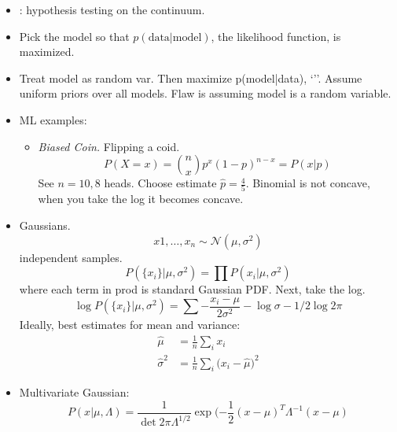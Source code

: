 \documentclass[12pt]{article}
\begin{document}
\begin{itemize}
	\item {}: hypothesis testing on the continuum. 
	\item {} Pick the model so that $p(\text{data}|\text{model})$, the likelihood function, is maximized. 
	\item Treat model as random var. Then maximize p(model|data), `''. Assume uniform priors over all models. Flaw is assuming model is a random variable. 
	\item ML examples:
	\begin{itemize}
		\item \textit{Biased Coin.} Flipping a coid. 
		\begin{equation}
		P(X = x) = {n \choose x} p^x (1 - p)^{n-x} = P(x | p)
		\end{equation}
		See $n = 10, 8$ heads. Choose estimate $\hat{p} = \frac{4}{5}$. Binomial is not concave, when you take the log it becomes concave. 
	\end{itemize}
	
	\item Gaussians. 
	\begin{equation}
	x1, \ldots, x_n \sim \mathcal{N} (\mu, \sigma^2)
	\end{equation}
	independent samples. 
	\begin{equation}
	P(\{x_i\} | \mu, \sigma^2) = \prod P(x_i | \mu, \sigma^2)
	\end{equation}
	where each term in prod is standard Gaussian PDF.  Next, take the log. 
	\begin{equation}
	\log P(\{x_i\} | \mu, \sigma^2) = \sum - \frac{ x_i - \mu}{2 \sigma^2} - \log \sigma - 1/2 \log 2\pi
	\end{equation}
	Ideally, best estimates for mean and variance:
	\begin{align}
	\hat{\mu} &= \frac{1}{n} \sum_i x_i \\
	\hat{\sigma}^2 &= \frac{1}{n} \sum_i \big(x_i -  \hat{\mu} \big)^2 
	\end{align}
	
	\item Multivariate Gaussian:
	\begin{equation}
	P(x | \mu, \Lambda) = \frac{1}{\det 2 \pi \Lambda^{1/2}} \exp(-\frac{1}{2} (x - \mu)^T \Lambda^{-1} (x - \mu)
	\end{equation}
\end{itemize}
\end{document}
